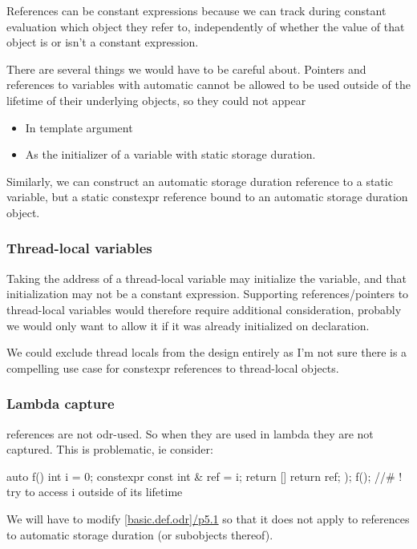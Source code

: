 \documentclass{wg21}
\begin{document}
References can be constant expressions because we can track during constant evaluation which object they refer to, independently of whether the value of that object is or isn't a constant expression.

There are several things we would have to be careful about.
Pointers and references to variables with automatic cannot be allowed to be used outside of the lifetime of their underlying objects, so they could not appear
\begin{itemize}
  \item In template argument
  \item As the initializer of a variable with static storage duration.
\end{itemize}

Similarly, we can construct an automatic storage duration reference to a static variable, but a static constexpr reference bound to an automatic storage duration object.

\subsubsection{Thread-local variables}

Taking the address of a thread-local variable may initialize the variable, and that initialization may not be a constant expression.
Supporting references/pointers to thread-local variables would therefore require additional consideration, probably we would only want to allow it if it was already initialized
on declaration.

We could exclude thread locals from the design entirely as I'm not sure there is a compelling use case for constexpr references to thread-local objects.

\subsubsection{Lambda capture}

 references are not odr-used. So when they are used in lambda they are not captured.
This is problematic, ie consider:

\begin{colorblock}
auto f() {
    int i = 0;
    constexpr const int & ref = i;
    return [] {
        return ref;
    });
}
f(); //# ! try to access i outside of its lifetime
\end{colorblock}

We will have to modify \href{http://eel.is/c++draft/basic.def.odr#5.1}{[basic.def.odr]/p5.1} so that it does not apply to references to automatic storage duration
(or subobjects thereof).
\end{document}
